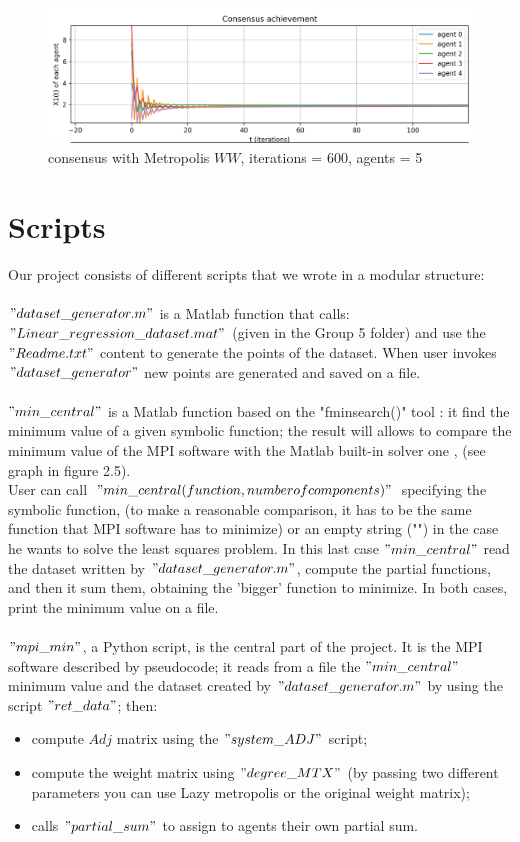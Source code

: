 \documentclass[a4paper,11pt,oneside]{book}
\begin{document}
{{\begin{figure}[H]
\end{figure}

\begin{figure}[H]
 \centering
 \includegraphics[width=14.5 cm]{lazy.jpg}
 \caption{consensus with Metropolis $WW$, iterations = 600, agents = 5}
 
\end{figure}

\section{Scripts}
Our project consists of different scripts that we wrote in a  modular structure: \\\\$"dataset\_generator.m"$ is a Matlab function that calls:\\$"Linear\_regression\_dataset.mat"$ (given in the Group 5 folder) and use the $"Readme.txt"$ content to generate the points of the dataset.  When user invokes $"dataset\_generator"$ new points are generated and saved on a file.\\\\
 $ "min\_central"$ is a Matlab function based on the "fminsearch()" tool : it find the minimum value of a given  symbolic function; the result will allows to compare the minimum value of the MPI software with the Matlab built-in solver one , (see graph in figure 2.5). \\User can call $ "min\_central(function,number of components)"$ specifying the symbolic function, (to make a reasonable comparison, it has to be the same function that MPI software has to minimize) or an empty string ("") in the case he wants to solve the least squares problem. In this last case $ "min\_central"$ read the dataset written by $"dataset\_generator.m"$, compute the partial functions, and then it sum them, obtaining the 'bigger' function to minimize. In both cases, print the minimum value on a file.
 \\\\$"mpi\_min"$, a Python script, is the central part of the project. It is the MPI software described by pseudocode; it reads from a file the $ "min\_central"$ minimum value and the dataset created by $"dataset\_generator.m"$ by using the script $"ret\_data"$; then: 
 \begin{itemize}
 \item compute $Adj$ matrix using the  $"system\_ADJ"$ script;
 \item compute the weight matrix using $"degree\_MTX"$ (by passing two different parameters you can use Lazy metropolis or the original weight matrix);
 \item calls $"partial\_sum"$ to assign to agents their own partial sum.
 

\end{itemize}}}
\end{document}
